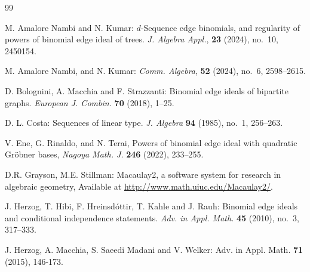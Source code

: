\documentclass[11pt,a4paper,reqno]{amsart}
\theoremstyle{definition}
\begin{document}
\begin{thebibliography}{99}


 M. Amalore Nambi and N. Kumar: $d$-Sequence edge binomials, and regularity of powers of binomial edge ideal of trees. {\emph{J. Algebra Appl.}},  {\bf 23} (2024), no.~10, 2450154.

 M. Amalore Nambi, and N. Kumar:  {\emph{Comm. Algebra}}, {\bf 52} (2024), no.~6, 2598–2615.


 D. Bolognini, A. Macchia and F. Strazzanti: Binomial edge ideals of bipartite graphs. \emph{European J. Combin.} {\bf 70} (2018), 1–25. 




 D. L. Costa: Sequences of linear type. \emph{J. Algebra} {\bf 94} (1985), no.~1, 256–263. 


 

  V. Ene,  G. Rinaldo,  and N. Terai, \newblock Powers of binomial edge ideal with quadratic Gr\"{o}bner bases, \emph{Nagoya Math. J.} {\bf246} (2022), 233–255. 



 D.R. Grayson, M.E. Stillman: Macaulay2, a software system for research in algebraic geometry, Available at \url{http://www.math.uiuc.edu/Macaulay2/}.



 J. Herzog, T. Hibi, F. Hreinsd\'{o}ttir, T. Kahle and J. Rauh: Binomial edge ideals and conditional independence statements. \emph{Adv. in Appl. Math.} {\bf 45} (2010), no.~3, 317–333. 


 J. Herzog, A. Macchia, S. Saeedi Madani and V. Welker:  {Adv. in Appl. Math.} {\bf 71} (2015), 146-173.



\end{thebibliography}
\end{document}
